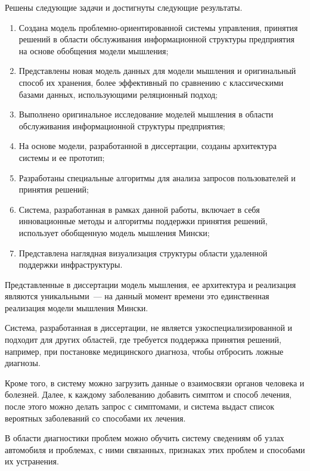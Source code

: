 
Решены следующие задачи и достигнуты следующие результаты.
\begin{enumerate}
  \item Создана модель проблемно-ориентированной системы управления, принятия решений в области обслуживания информационной структуры предприятия на основе обобщения модели мышления;
  \item Представлены новая модель данных для модели мышления и оригинальный способ их хранения, более эффективный по сравнению с классическими базами данных, использующими реляционный подход;
  \item Выполнено оригинальное исследование моделей мышления в области обслуживания информационной структуры предприятия;
  \item На основе модели, разработанной в диссертации, созданы архитектура системы и ее прототип; 
  \item Разработаны специальные алгоритмы для анализа запросов пользователей и принятия решений;
  \item Система, разработанная в рамках данной работы, включает в себя инновационные методы и алгоритмы поддержки принятия решений, использует обобщенную модель мышления Мински;
  \item Представлена наглядная визуализация структуры области удаленной поддержки инфраструктуры.
\end{enumerate}

Представленные в диссертации модель мышления, ее архитектура и реализация являются уникальными~--- на данный момент времени это единственная реализация модели мышления Мински. \par
Система, разработанная в диссертации, не является узкоспециализированной и подходит для других областей, где требуется поддержка принятия решений, например, при постановке медицинского диагноза, чтобы отбросить ложные диагнозы. \par
Кроме того, в систему можно загрузить данные о взаимосвязи органов человека и болезней. Далее, к каждому заболеванию добавить симптом и способ лечения, после этого можно делать запрос с симптомами, и система выдаст список вероятных заболеваний со способами их лечения. \par
В области диагностики проблем можно обучить систему сведениям об узлах автомобиля и проблемах, с ними связанных, признаках этих проблем и способами их устранения. 



